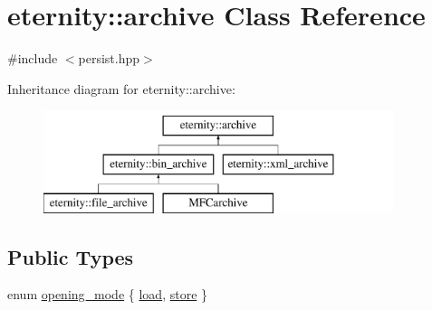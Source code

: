 \hypertarget{classeternity_1_1archive}{}\section{eternity\+:\+:archive Class Reference}
\label{classeternity_1_1archive}


{\ttfamily \#include $<$persist.\+hpp$>$}

Inheritance diagram for eternity\+:\+:archive\+:\begin{figure}[H]
\begin{center}
\leavevmode
\includegraphics[height=3.000000cm]{classeternity_1_1archive}
\end{center}
\end{figure}
\subsection*{Public Types}
\begin{DoxyCompactItemize}
\item 
enum \hyperlink{classeternity_1_1archive_a8881f9ce8dbed2ee600c64b7925afef0}{opening\+\_\+mode} \{ \hyperlink{classeternity_1_1archive_a8881f9ce8dbed2ee600c64b7925afef0a5b952c27ebe4ca2612e939a1aa19baf5}{load}, 
\hyperlink{classeternity_1_1archive_a8881f9ce8dbed2ee600c64b7925afef0a06c18c297779389cb1cb03a2a7590ca8}{store}
 \}
\end{DoxyCompactItemize}
